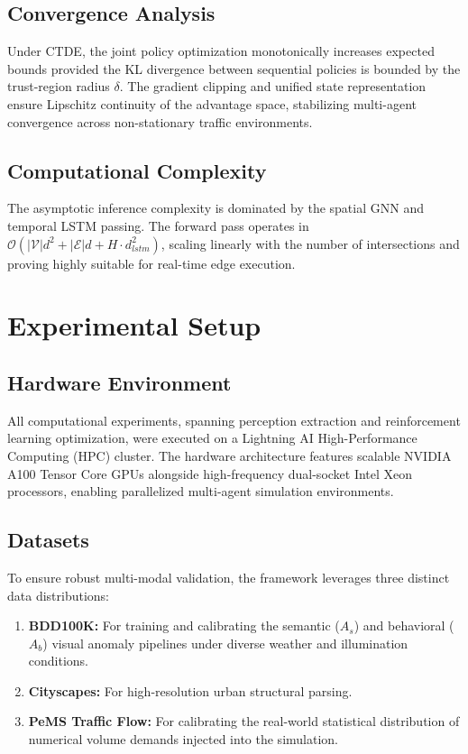\documentclass[journal]{IEEEtran}
\begin{document}
\subsection{Convergence Analysis}
Under CTDE, the joint policy optimization monotonically increases expected bounds provided the KL divergence between sequential policies is bounded by the trust-region radius $\delta$. The gradient clipping and unified state representation ensure Lipschitz continuity of the advantage space, stabilizing multi-agent convergence across non-stationary traffic environments.

\subsection{Computational Complexity}
The asymptotic inference complexity is dominated by the spatial GNN and temporal LSTM passing. The forward pass operates in $\mathcal{O}(|\mathcal{V}|d^2 + |\mathcal{E}|d + H \cdot d_{lstm}^2)$, scaling linearly with the number of intersections and proving highly suitable for real-time edge execution.

\section{Experimental Setup}
\label{sec:experimental_setup}

\subsection{Hardware Environment}
All computational experiments, spanning perception extraction and reinforcement learning optimization, were executed on a Lightning AI High-Performance Computing (HPC) cluster. The hardware architecture features scalable NVIDIA A100 Tensor Core GPUs alongside high-frequency dual-socket Intel Xeon processors, enabling parallelized multi-agent simulation environments.

\subsection{Datasets}
\label{subsec:datasets}
To ensure robust multi-modal validation, the framework leverages three distinct data distributions:
\begin{enumerate}
    \item \textbf{BDD100K:} For training and calibrating the semantic ($A_s$) and behavioral ($A_b$) visual anomaly pipelines under diverse weather and illumination conditions.
    \item \textbf{Cityscapes:} For high-resolution urban structural parsing.
    \item \textbf{PeMS Traffic Flow:} For calibrating the real-world statistical distribution of numerical volume demands injected into the simulation.
\end{enumerate}
\end{document}
